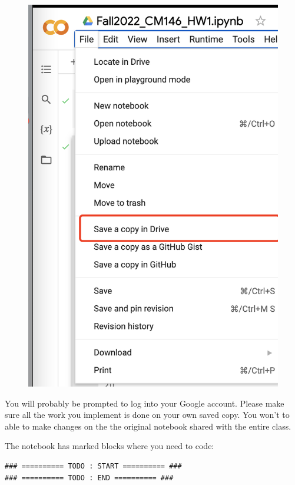 \begin{figure}[ht]
\centering
\includegraphics[scale=0.25]{save-colab-to-drive.png}
\end{figure}

You will probably be prompted to log into your Google account. Please make sure all the work you implement is done on your own saved copy. You won’t to able to make changes on the the original notebook shared with the entire class.

The notebook has marked blocks where you need to code:
\begin{verbatim}
### ========== TODO : START ========== ###
### ========== TODO : END ========== ###
\end{verbatim}

